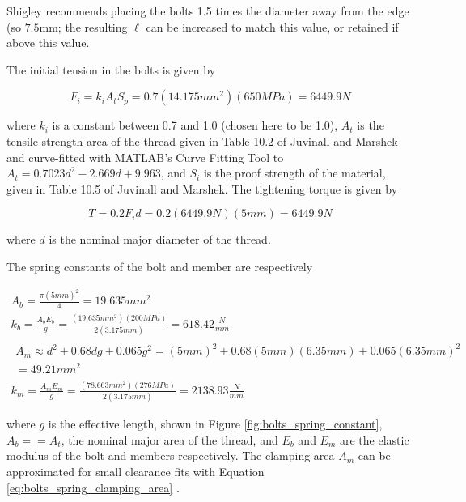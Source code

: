 Shigley recommends placing the bolts 1.5 times the diameter away from the edge (so $7.5\text{mm}$; the resulting $\ell$ can be increased to match this value, or retained if above this value.


The initial tension in the bolts is given by \cite{juvinall_fundamentals_2012}

\begin{equation} \label{eq:bolt_initial_tension}
    F_i = k_i A_t S_p = 0.7(14.175mm^2)(650MPa) = 6449.9N
\end{equation}{}

where $k_i$ is a constant between 0.7 and 1.0 (chosen here to be 1.0), $A_t$ is the tensile strength area of the thread given in Table 10.2 of Juvinall and Marshek and curve-fitted with MATLAB's Curve Fitting Tool to $A_t = 0.7023d^2 - 2.669d + 9.963$, and $S_i$ is the proof strength of the material, given in Table 10.5 of Juvinall and Marshek.
The tightening torque is given by

\begin{equation}
    T = 0.2 F_i d = 0.2 (6449.9N) (5mm) = 6449.9N
\end{equation}{}

where $d$ is the nominal major diameter of the thread.

The spring constants of the bolt and member are respectively

\begin{gather}
    A_b = \frac{\pi(5mm)^2}{4} = 19.635mm^2
    \\
    k_b = \frac{A_b E_b}{g} = \frac{(19.635mm^2)(200MPa)}{2(3.175mm)} = 618.42\frac{N}{mm}
    \\
    \begin{split}
        A_m \approx d^2 + 0.68 d g + 0.065 g^2 = (5mm)^2 + 0.68(5mm)(6.35mm) + 0.065(6.35mm)^2 \\
        = 49.21mm^2 \label{eq:bolts_spring_clamping_area}
    \end{split}
    \\
    k_m = \frac{A_m E_m}{g} = \frac{(78.663mm^2)(276MPa)}{2(3.175mm)} = 2138.93\frac{N}{mm}
\end{gather}{}

where $g$ is the effective length, shown in Figure \ref{fig:bolts_spring_constant}, $A_b == A_t$, the nominal major area of the thread, and $E_b$ and $E_m$  are the elastic modulus of the bolt and members respectively.
The clamping area $A_m$ can be approximated for small clearance fits with Equation \ref{eq:bolts_spring_clamping_area} \cite{juvinall_fundamentals_2012}.

